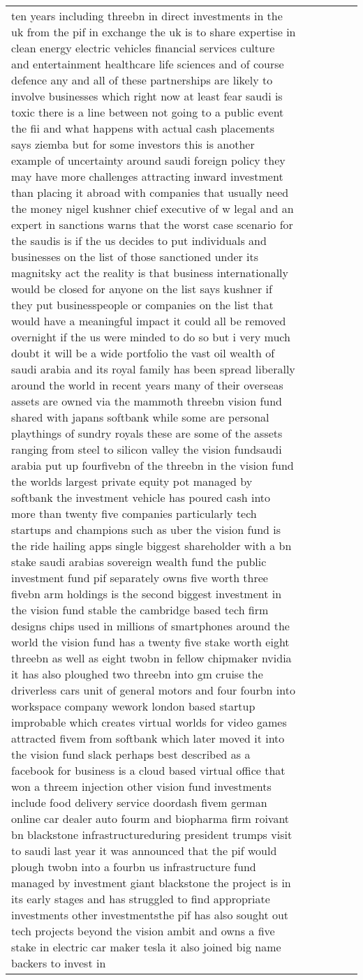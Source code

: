 \documentclass[]{article}
\begin{document}
\begin{table}[!h]
\begin{tabular}[t]{llllll}
ten years including threebn in direct investments in the uk from the pif in exchange the uk is to share expertise in clean energy electric vehicles financial services culture and entertainment healthcare life sciences and of course defence any and all of these partnerships are likely to involve businesses which right now at least fear saudi is toxic there is a line between not going to a public event the fii and what happens with actual cash placements says ziemba but for some investors this is another example of uncertainty around saudi foreign policy they may have more challenges attracting inward investment than placing it abroad with companies that usually need the money nigel kushner chief executive of w legal and an expert in sanctions warns that the worst case scenario for the saudis is if the us decides to put individuals and businesses on the list of those sanctioned under its magnitsky act the reality is that business internationally would be closed for anyone on the list says kushner if they put businesspeople or companies on the list that would have a meaningful impact it could all be removed overnight if the us were minded to do so but i very much doubt it will be a wide portfolio the vast oil wealth of saudi arabia and its royal family has been spread liberally around the world in recent years many of their overseas assets are owned via the mammoth threebn vision fund shared with japans softbank while some are personal playthings of sundry royals these are some of the assets ranging from steel to silicon valley the vision fundsaudi arabia put up fourfivebn of the threebn in the vision fund the worlds largest private equity pot managed by softbank the investment vehicle has poured cash into more than twenty five companies particularly tech startups and champions such as uber the vision fund is the ride hailing apps single biggest shareholder with a bn stake saudi arabias sovereign wealth fund the public investment fund pif separately owns five worth three fivebn arm holdings is the second biggest investment in the vision fund stable the cambridge based tech firm designs chips used in millions of smartphones around the world the vision fund has a twenty five stake worth eight threebn as well as eight twobn in fellow chipmaker nvidia it has also ploughed two threebn into gm cruise the driverless cars unit of general motors and four fourbn into workspace company wework london based startup improbable which creates virtual worlds for video games attracted fivem from softbank which later moved it into the vision fund slack perhaps best described as a facebook for business is a cloud based virtual office that won a threem injection other vision fund investments include food delivery service doordash fivem german online car dealer auto fourm and biopharma firm roivant bn blackstone infrastructureduring president trumps visit to saudi last year it was announced that the pif would plough twobn into a fourbn us infrastructure fund managed by investment giant blackstone the project is in its early stages and has struggled to find appropriate investments other investmentsthe pif has also sought out tech projects beyond the vision ambit and owns a five stake in electric car maker tesla it also joined big name backers to invest in 
\end{tabular}
\end{table}
\end{document}
